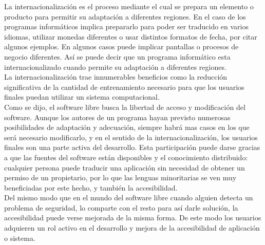 La internacionalización es el proceso mediante el cual se prepara un elemento o producto para permitir su adaptación a diferentes regiones. En el caso de los programas informáticos implica prepararlo para poder ser traducido en varios idiomas, utilizar monedas diferentes o usar distintos formatos de fecha, por citar algunos ejemplos. En algunos casos puede implicar pantallas o procesos de  negocio diferentes. Así se puede decir que un programa informático esta internacionalizado cuando permite su adaptación a diferentes regiones.\\

La internacionalización trae innumerables beneﬁcios como la reducción signiﬁcativa de la cantidad de entrenamiento necesario para que los usuarios ﬁnales puedan utilizar un sistema computacional.\\

Como se dijo, el software libre busca la libertad de acceso y modiﬁcación del software. Aunque los autores de un programa hayan previsto numerosas posibilidades de adaptación y adecuación, siempre habrá mas casos en los que será necesario modiﬁcarlo, y en el sentido de la internacionalización, los usuarios ﬁnales son una parte activa del desarrollo. Esta participación puede darse gracias a que las fuentes del software están disponibles y el conocimiento distribuido: cualquier persona puede traducir una aplicación sin necesidad de obtener un permiso de un propietario, por lo que las lenguas minoritarias se ven muy beneﬁciadas por este hecho, y también la accesibilidad.\\

Del mismo modo que en el mundo del software libre cuando alguien detecta un problema de seguridad, lo comparte con el resto para así darle solución, la accesibilidad puede verse mejorada de la misma forma. De este modo los usuarios adquieren un rol activo en el desarrollo y mejora de la accesibilidad de aplicación o sistema.